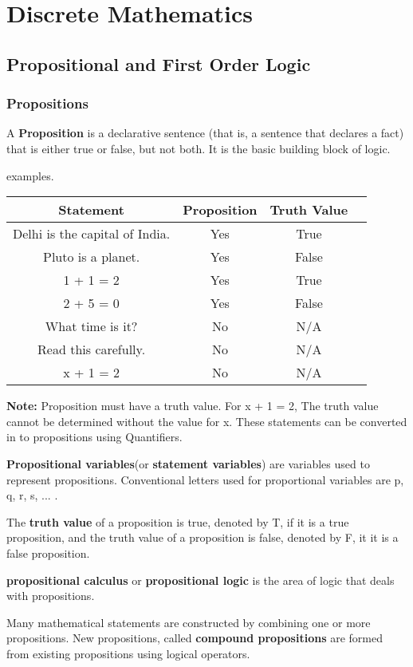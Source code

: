 \documentclass{book}
\begin{document}
\chapter {Discrete Mathematics}

\section {Propositional and First Order Logic}
\subsection {Propositions}
A \textbf{Proposition} is a declarative sentence (that is, a sentence that declares a fact) that is either true or false, but not both. It is the basic building block of logic.

examples.
\begin{center}
\begin{tabular}{ |c|c|c|c|}
\hline
Statement & Proposition & Truth Value  \\ \hline
Delhi is the capital of India. & Yes & True \\
Pluto is a planet. & Yes & False \\
1 + 1 = 2 & Yes & True  \\
2 + 5 = 0 & Yes & False  \\
What time is it? & No & N/A \\
Read this carefully. & No & N/A \\
x  + 1 = 2 & No & N/A \\ \hline
\end{tabular}
\end{center}

\textbf{Note:} Proposition must have a truth value. For x + 1 = 2, The truth value cannot be determined without the value for x. These statements can be converted in to propositions using Quantifiers.

\textbf{Propositional variables}(or \textbf{statement variables}) are variables used to represent propositions. Conventional letters used for proportional variables are p, q, r, s, ... .

The \textbf{truth value} of a proposition is true, denoted by T, if it is a true proposition, and the truth value of a proposition is false, denoted by F, it it is a false proposition.

\textbf{propositional calculus} or \textbf{propositional logic} is the area of logic that deals with propositions.

Many mathematical statements are constructed by combining one or more propositions. New propositions, called \textbf{compound propositions} are formed from existing propositions using logical operators.
\end{document}
